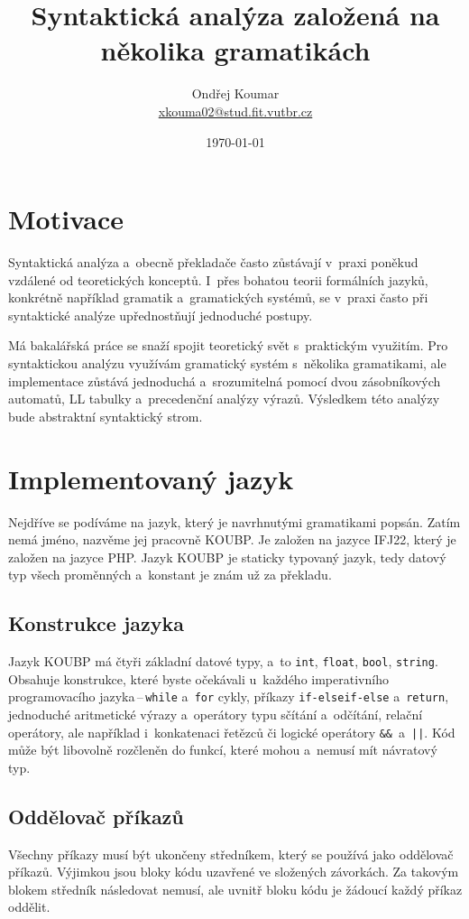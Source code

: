 \documentclass[a4paper]{article}
\author{Ondřej Koumar \\ \href{mailto:xkouma02@stud.fit.vutbr.cz}{xkouma02@stud.fit.vutbr.cz}}
\title{\huge Syntaktická analýza založená na několika gramatikách}
\date{\today}
\begin{document}
\maketitle

\section*{Motivace}
Syntaktická analýza a~obecně překladače často zůstávají v~praxi poněkud vzdálené od teoretických konceptů.
I~přes bohatou teorii formálních jazyků, konkrétně například gramatik a~gramatických systémů, se v~praxi často při syntaktické analýze upřednostňují jednoduché postupy.

Má bakalářská práce se snaží spojit teoretický svět s~praktickým využitím. 
Pro syntaktickou analýzu využívám gramatický systém s~několika gramatikami, ale implementace zůstává jednoduchá a~srozumitelná pomocí dvou zásobníkových automatů, LL tabulky a~precedenční analýzy výrazů.
Výsledkem této analýzy bude abstraktní syntaktický strom.

\section*{Implementovaný jazyk}
Nejdříve se podíváme na jazyk, který je navrhnutými gramatikami popsán.
Zatím nemá jméno, nazvěme jej pracovně KOUBP.
Je založen na jazyce IFJ22, který je založen na jazyce PHP.
Jazyk KOUBP je staticky typovaný jazyk, tedy datový typ všech proměnných a~konstant je znám už za překladu.

\subsection*{Konstrukce jazyka}
Jazyk KOUBP má čtyři základní datové typy, a~to \texttt{int}, \texttt{float}, \texttt{bool}, \texttt{string}.
Obsahuje konstrukce, které bys\-te očekávali u~každého imperativního programovacího jazyka\,--\,\texttt{while} a~\texttt{for} cykly, příkazy \texttt{if-elseif-else} a~\texttt{return}, jednoduché aritmetické výrazy a~operátory typu sčítání a~odčítání, relační operátory, ale například i~konkatenaci řetězců či logické operátory \mbox{\texttt{\&\&} a~\texttt{||}}.
Kód může být libovolně rozčleněn do funkcí, které mohou a~nemusí mít návratový typ.

\subsection*{Oddělovač příkazů}
Všechny příkazy musí být ukončeny středníkem, který se používá jako od\-dě\-lo\-vač příkazů.
Výjimkou jsou bloky kódu uzavřené ve složených závorkách. Za takovým blokem středník následovat nemusí, ale uvnitř bloku kódu je žádoucí každý příkaz oddělit.
\end{document}
